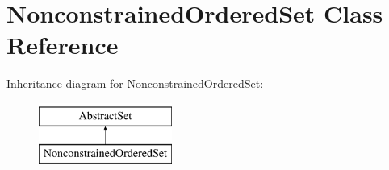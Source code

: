 \hypertarget{classNonconstrainedOrderedSet}{\section{Nonconstrained\-Ordered\-Set Class Reference}
\label{classNonconstrainedOrderedSet}
}
Inheritance diagram for Nonconstrained\-Ordered\-Set\-:\begin{figure}[H]
\begin{center}
\leavevmode
\includegraphics[height=2.000000cm]{classNonconstrainedOrderedSet}
\end{center}
\end{figure}
